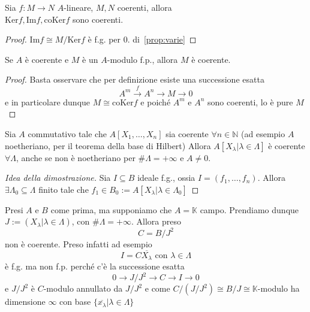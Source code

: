 \begin{corollary}{}
    Sia \(f: M \to N\) \(A\)-lineare, \(M, N\) coerenti, allora \\ \(\mathrm{Ker}f, \mathrm{Im}f, \mathrm{coKer}f\) sono coerenti.
\end{corollary}
\begin{proof}{}
    \(\mathrm{Im}f \cong M / \mathrm{Ker} f\) è f.g. per 0. di~\ref{prop:varie}
\end{proof}
\begin{corollary}{}
    Se \(A\) è coerente e \(M\) è un \(A\)-modulo f.p., allora \(M\) è coerente.
\end{corollary}
\begin{proof}{}
    Basta osservare che per definizione esiste una successione esatta 
    \[
      A^{m} \overset{f}{\to } A^{n} \to M \to 0
    \]
    e in particolare dunque \(M \cong \mathrm{coKer}f\) e poiché \(A^{m}\) e \(A^{n}\) sono coerenti, lo è pure \(M\) 
\end{proof}
\begin{example}{}
    Sia \(A\) commutativo tale che \(A[X_{1}, \dots, X_{n}]\) sia coerente \(\forall n \in \mathbb{N}\) (ad esempio \(A\) noetheriano, per il teorema della base di Hilbert)
    Allora \(A[X_{\lambda} | \lambda \in \Lambda]\) è coerente \(\forall \Lambda\), anche se non è noetheriano per \(\# \Lambda = +\infty\) e \(A \neq 0\).
    \begin{proof}[Idea della dimostrazione]
        Sia \(I \subseteq B \) ideale f.g., ossia \(I = {(f_{1}, \dots, f_{n})}\). Allora \(\exists \Lambda_{0} \subseteq \Lambda \) finito tale che \(f_{1} \in B_{0} := A[X_\lambda | \lambda \in \Lambda_{0}]\) 
    \end{proof}
\end{example}
\begin{example}
    Presi \(A\) e \(B\) come prima, ma supponiamo che \(A = \mathbb{K}\) campo.
    Prendiamo dunque \(J := {(X_{\lambda} | \lambda \in \Lambda)}\), con \(\#
    \Lambda = +\infty\). Allora preso
    \[
      C = B / J^2
    \]
    non è coerente. Preso infatti ad esempio 
    \[
      I = C \overline{X_{\lambda} } \text{  con }\lambda \in \Lambda
    \]
    è f.g. ma non f.p. perché c'è la successione esatta 
    \[
      0 \to J / J^2 \to C \to I \to 0
    \]
    e \(J / J^2\) è \(C\)-modulo annullato da \(J / J^2\) e come \(C / {(J / J^2)} \cong B / J \cong \mathbb{K}\)-modulo ha dimensione \(\infty\)  con base \(\{\overline{x_{\lambda} }| \lambda \in \Lambda \} \) 
\end{example}


